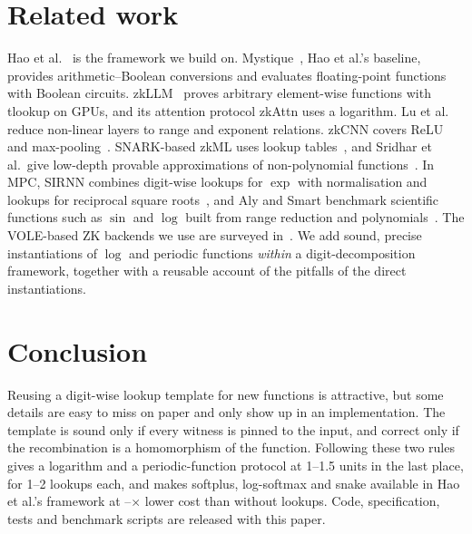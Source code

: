\documentclass[10pt,twocolumn]{article}
\theoremstyle{remark}
\begin{document}
\section{Related work}
Hao et al.~\cite{hao2024scalable} is the framework we build on. Mystique~\cite{weng2021mystique},
Hao et al.'s baseline, provides arithmetic--Boolean conversions and evaluates floating-point
functions with Boolean circuits. zkLLM~\cite{sun2024zkllm} proves arbitrary element-wise functions
with \textsf{tlookup} on GPUs, and its attention protocol zkAttn uses a logarithm. Lu et
al.~\cite{lu2024extensible} reduce non-linear layers to range and exponent relations. zkCNN
covers ReLU and max-pooling~\cite{liu2021zkcnn}. SNARK-based zkML uses lookup
tables~\cite{kang2022scaling}, and Sridhar et al.\ give low-depth provable approximations of
non-polynomial functions~\cite{sridhar2025provable}. In MPC, SIRNN combines digit-wise lookups
for $\exp$ with normalisation and lookups for reciprocal square roots~\cite{rathee2021sirnn}, and
Aly and Smart benchmark scientific functions such as $\sin$ and $\log$ built from range reduction
and polynomials~\cite{aly2019benchmarking}. The VOLE-based ZK backends we use
are surveyed in~\cite{baum2023sok}. We add sound, precise instantiations of $\log$ and periodic
functions \emph{within} a digit-decomposition framework, together with a reusable account of the
pitfalls of the direct instantiations.

\section{Conclusion}
Reusing a digit-wise lookup template for new functions is attractive, but some details are easy to
miss on paper and only show up in an implementation. The template is sound only if every witness is
pinned to the input, and correct only if the recombination is a homomorphism of the function.
Following these two rules gives a logarithm and a periodic-function protocol at 1--1.5 units in the
last place, for 1--2 lookups each, and makes softplus, log-softmax
and snake available in Hao et al.'s framework at \SpeedMin--\SpeedMax$\times$ lower cost than
without lookups. Code, specification, tests and benchmark scripts are released with this paper.

{\small


}
\end{document}

